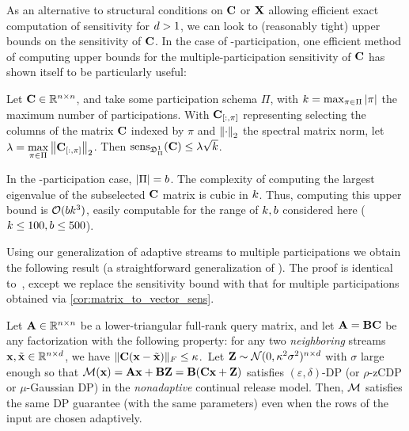 \documentclass{article} %
\theoremstyle{named}
\begin{document}
 As an alternative to structural conditions on $\mathbf{C}$ or $\mathbf{X}$ allowing efficient exact computation of sensitivity for $d > 1$, we can look to (reasonably tight) upper bounds on the sensitivity of $\mathbf{C}$. %
In the case of \multiepoch-participation, one efficient method of computing upper bounds for the multiple-participation sensitivity of $\mathbf{C}$ has shown itself to be particularly useful:
\newcommand{\absDcorners}{\bar{\Dcorners}}

\begin{thm}\label{thm:eval_sens_ub}
Let $\mathbf{C} \in \mathbb{R}^{n \times n}$, and take some participation schema $\Pi$, with $k = \max_{\pi \in \Pi} |\pi|$ the maximum number of participations. With $\mathbf{C}_{[:, \pi]}$ representing selecting the columns of the matrix $\mathbf{C}$ indexed by $\pi$ and $\left\|\cdot\right\|_2$ the spectral matrix norm, let
$
\lambda=\max\limits_{\pi \in \Pi}\left\|\mathbf{C}_{[:, \pi]}\right\|_2
$. 
Then 
$
\operatorname{sens}_{\mathfrak{D}^1_\Pi}(\mathbf{C}) \le \lambda\sqrt{k}
$.

\end{thm}
In the \multiepoch-participation case, $|\Pi| = b$. The complexity of computing the largest eigenvalue of the subselected $\mathbf{C}$ matrix is cubic in $k$. Thus, computing this upper bound is $\mathcal{O}(bk^3)$, easily computable for the range of $k, b$ considered here ($k \leq 100, b \leq 500$).



Using our generalization of adaptive streams to multiple participations we obtain the following result (a straightforward generalization of \citet[Theorem 2.1]{denisov22matfact}). The proof is identical to~\cite{denisov22matfact}, except we replace the sensitivity bound with that for multiple participations obtained via \cref{cor:matrix_to_vector_sens}.

\begin{thm}\label{thm:GaussianAdaptive}
Let $\mathbf{A}\in\mathbb{R}^{n\times n}$ be a lower-triangular full-rank query matrix, and let $\mathbf{A}=\mathbf{B}\mathbf{C}$ be any factorization with the following property: for any two \textit{neighboring} streams $\mathbf{x}, \tilde{\mathbf{x}}\in \mathbb{R}^{n \times d}$, we have $\|\mathbf{C}(\mathbf{x} - \tilde{\mathbf{x}})\|_F\leq \kappa$.\ Let $\mathbf{Z}\sim\mathcal{N}(0,\kappa^2\sigma^2)^{n\times d}$ with $\sigma$ large enough so that $\mathcal{M}(\mathbf{x}) = \mathbf{A}\mathbf{x} + \mathbf{B}\mathbf{Z} = \mathbf{B}(\mathbf{C} \mathbf{x} +\mathbf{Z})$ satisfies  $(\varepsilon,\delta)$-DP (or $\rho$-zCDP or $\mu$-Gaussian DP) in the \textit{nonadaptive} continual release model. Then, $\mathcal{M}$ satisfies the same DP guarantee (with the same parameters) even when the 
rows of the input are chosen adaptively.
\end{thm}
\end{document}
